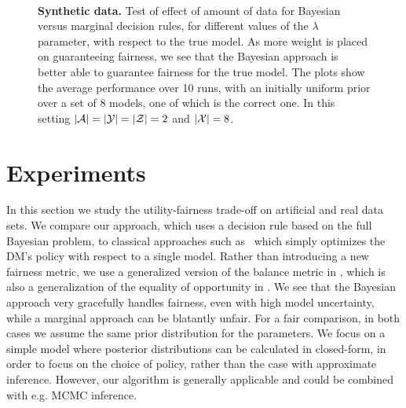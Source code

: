 \setlength {}

\begin{figure*}  
\centering
   \subfloat[$\lambda=0$]{
    
  }
  \subfloat[$\lambda=0.25$]{
    
  }
  \subfloat[$\lambda=0.5$]{
    
  }
  \\
  \subfloat[$\lambda=0.75$]{
    
  }
  \subfloat[$\lambda=1$]{
    
  }
  \subfloat[legend]{
    \raisebox{4em}{}
  }
  \caption{\textbf{Synthetic data.} Test of effect of amount of data for Bayesian versus marginal decision rules, for different values of the $\lambda$ parameter, with respect to the true model. As more weight is placed on guaranteeing fairness, we see that the Bayesian approach is better able to guarantee fairness for the true model. The plots show the average performance over 10 runs, with an initially uniform prior over a set of 8 models, one of which is the correct one. In this setting $|\mathcal{A}| = |\mathcal{Y}| = |\mathcal{Z}| = 2$ and $|\mathcal{X}| = 8$.}
  \label{fig_exp_1}
\end{figure*}

\section{Experiments} 
\label{sec:experiments}
In this section we study the utility-fairness trade-off on
artificial and real data sets.  We compare our approach, which uses a
decision rule based on the full Bayesian problem, to classical
approaches such as~\cite{HardtPNS16} which simply optimizes the DM's
policy with respect to a single model. Rather than introducing a new
fairness metric, we use a generalized version of the balance metric in
\cite{kleinberg2016inherent}, which is also a generalization of the
equality of opportunity in \cite{HardtPNS16}. We see that the Bayesian
approach very gracefully handles fairness, even with high model
uncertainty, while a marginal approach can be blatantly unfair.
%
For a fair comparison, in both cases we assume the same prior distribution for the
parameters. We focus on a simple model where posterior distributions can be calculated in closed-form, in order to focus on the choice of policy, rather than the case with approximate inference. However, our algorithm is generally applicable and could be combined with e.g. MCMC inference.


